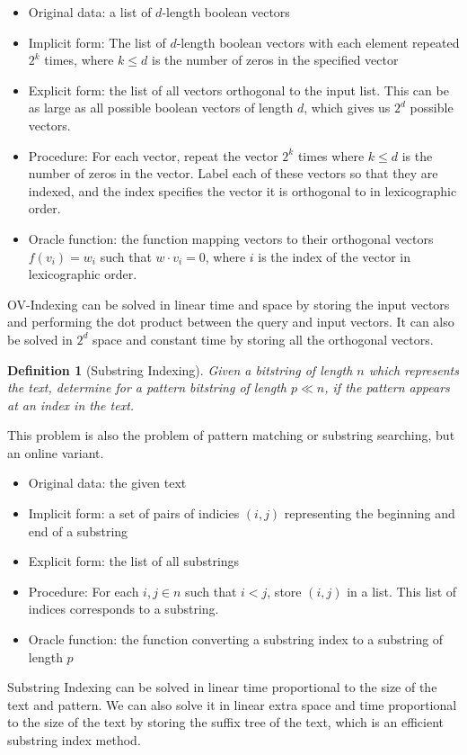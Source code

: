 \documentclass{article}
\newtheorem{definition}{Definition}
\begin{document}
\begin{itemize}
    \item Original data: a list of $d$-length boolean vectors
    \item Implicit form: The list of $d$-length boolean vectors with each element repeated $2^k$ times, where $k \leq d$ is the number of zeros in the specified vector
    \item Explicit form: the list of all vectors orthogonal to the input list. This can be as large as all possible boolean vectors of length $d$, which gives us $2^d$ possible vectors.
    \item Procedure: For each vector, repeat the vector $2^k$ times where $k \leq d$ is the number of zeros in the vector. Label each of these vectors so that they are indexed, and the index specifies the vector it is orthogonal to in lexicographic order.
    \item Oracle function: the function mapping vectors to their orthogonal vectors $f(v_i) = w_i$ such that $w \cdot v_i = 0$, where $i$ is the index of the vector in lexicographic order.
\end{itemize}
OV-Indexing can be solved in linear time and space by storing the input vectors and performing the dot product between the query and input vectors. It can also be solved in $2^d$ space and constant time by storing all the orthogonal vectors.
\begin{definition}[Substring Indexing]
Given a bitstring of length $n$ which represents the text, determine for a pattern bitstring of length $p \ll n$, if the pattern appears at an index in the text.
\end{definition}
This problem is also the problem of pattern matching or substring searching, but an online variant.
\begin{itemize}
    \item Original data: the given text
    \item Implicit form: a set of pairs of indicies $(i,j)$ representing the beginning and end of a substring
    \item Explicit form: the list of all substrings
    \item Procedure: For each $i,j \in n$ such that $i<j$, store $(i,j)$ in a list. This list of indices corresponds to a substring.
    \item Oracle function: the function converting a substring index to a substring of length $p$
\end{itemize}
Substring Indexing can be solved in linear time proportional to the size of the text and pattern. We can also solve it in linear extra space and time proportional to the size of the text by storing the suffix tree of the text, which is an efficient substring index method.
\end{document}
